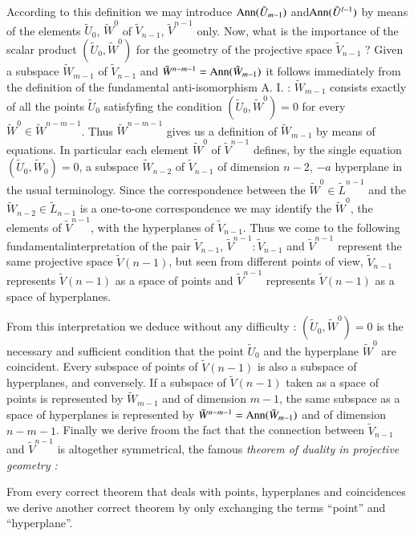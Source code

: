 According to this definition we may introduce $\operatorname{Ann} (\tilde{U}_{m-1})$
and\break $\operatorname{Ann}(\tilde{U}^{l-1})$ by means of the elements $\tilde{U}_0$,
$\tilde{W}^0$ of $\tilde{V}_{n-1}$, $\tilde{V}^{n-1}$ only. Now, what
is the importance of the scalar product $(\tilde{U}_0, \tilde{W}^0)$
for the geometry of the projective space $\tilde{V}_{n-1}$ ? Given a
subspace $\tilde{W}_{m-1}$ of $\tilde{V}_{n-1}$ and $\tilde{W}^{n-m-1}
= \operatorname{Ann} (\tilde{W}_{m-1})$ it follows immediately from the definition
of the fundamental anti-isomorphism A. I. : $\tilde{W}_{m-1}$ consists
exactly of all the points $\tilde{U}_0$ satisfyfing the condition
$(\tilde{U}_0, \tilde{W}^0) =0$ for every $\tilde{W}^0 \in
\tilde{W}^{n-m-1}$. Thus $\tilde{W}^{n-m-1}$ gives us a definition of
$\tilde{W}_{m-1}$ by means of equations. In particular each element 
$\tilde{W}^0$ of $\tilde{V}^{n-1}$ defines, by the single equation
$(\tilde{U}_0, \tilde{W}_0) =0$, a subspace $\tilde{W}_{n-2}$ of
$\tilde{V}_{n-1}$ of dimension $n-2$, $-a$ hyperplane in the usual
terminology. Since the correspondence between the $\tilde{W}^0 \in
\tilde{L}^{n-1}$ and the $\tilde{W}_{n-2} \in \tilde{L}_{n-1}$ is a
one-to-one correspondence we may identify the $\tilde{W}^0$, the
elements of $\tilde{V}^{n-1}$, with the hyperplanes of
$\tilde{V}_{n-1}$. Thus we come to the following
fundamental\pageoriginale interpretation of the pair
$\tilde{V}_{n-1}$, $\tilde{V}^{n-1} : \tilde{V}_{n-1}$ and
$\tilde{V}^{n-1}$ represent the same projective space
$\tilde{V}(n-1)$, but seen from different points of view,
$\tilde{V}_{n-1}$ represents $\tilde{V}(n-1)$ as a space of points and
$\tilde{V}^{n-1}$ represents $\tilde{V}(n-1)$ as a space of
hyperplanes.

From this interpretation we deduce without any difficulty :\break
$(\tilde{U}_0, \tilde{W}^0) = 0$ is the necessary and sufficient
condition that the point $\tilde{U}_0$ and the hyperplane
$\tilde{W}^0$ are coincident. Every subspace of points of
$\tilde{V}(n-1)$ is also a subspace of hyperplanes, and conversely. If
a subspace of $\tilde{V} (n-1)$ taken as a space of points is
represented by $\tilde{W}_{m-1}$ and of dimension $m-1$, the same
subspace as a space of hyperplanes is represented by
$\tilde{W}^{n-m-1} = \operatorname{Ann} (\tilde{W}_{m-1})$ and of dimension
$n-m-1$. Finally we derive froom the fact that the connection between
$\tilde{V}_{n-1}$ and $\tilde{V}^{n-1}$ is altogether symmetrical, the
famous \textit{theorem of duality in projective geometry :}

From every correct theorem that deals with points, hyperplanes and
coincidences we derive another correct theorem by only exchanging the
terms ``point'' and ``hyperplane''.


